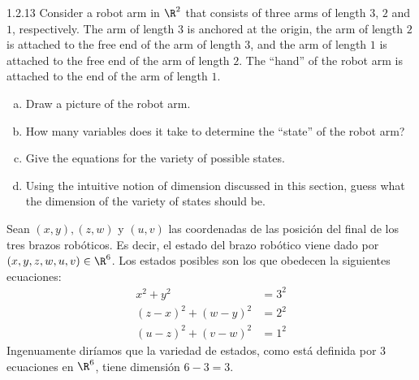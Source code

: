 \documentclass[twoside]{article}
\begin{document}
\begin{ejercicio}{1.2.13}
Consider a robot arm in $\R^2$ that consists of three arms of length $3$, $2$ and $1$, respectively.
The arm of length $3$ is anchored at the origin, the arm of length $2$ is attached to the free end of the arm of length $3$, and the arm of length $1$ is attached to the free end of the arm of length $2$.
The ``hand'' of the robot arm is attached to the end of the arm of length $1$.
\begin{enumerate}[a.]
\item Draw a picture of the robot arm.
\item How many variables does it take to determine the ``state'' of the robot arm?
\item Give the equations for the variety of possible states.
\item Using the intuitive notion of dimension discussed in this section, guess what the dimension of the variety of states should be.
\end{enumerate}
\end{ejercicio}
\begin{solucion}
Sean $(x,y), (z,w)$ y $(u,v)$ las coordenadas de las posición del final de los tres brazos robóticos.
Es decir, el estado del brazo robótico viene dado por $(x,y,z,w,u,v) \in \R^6$.
Los estados posibles son los que obedecen la siguientes ecuaciones:
\begin{align*}
x^2 + y^2 & = 3^2\\
(z-x)^2 + (w-y)^2 & = 2^2\\
(u-z)^2 + (v-w)^2 & = 1^2
\end{align*}
Ingenuamente diríamos que la variedad de estados, como está definida por $3$ ecuaciones en $\R^6$, tiene dimensión $6-3=3$.
\end{solucion}

\newpage
\end{document}
